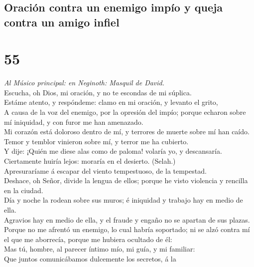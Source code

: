 \hypertarget{oraciuxf3n-contra-un-enemigo-impuxedo-y-queja-contra-un-amigo-infiel}{%
\subsection{Oración contra un enemigo impío y queja contra un amigo
infiel}\label{oraciuxf3n-contra-un-enemigo-impuxedo-y-queja-contra-un-amigo-infiel}}

\hypertarget{section-54}{%
\section{55}\label{section-54}}

 \emph{Al Músico principal: en Neginoth: Masquil de
David.}\\
Escucha, oh Dios, mi oración, y no te escondas de mi súplica.\\
 Estáme atento, y respóndeme: clamo en mi oración, y levanto
el grito,\\
 A causa de la voz del enemigo, por la opresión del impío;
porque echaron sobre mí iniquidad, y con furor me han amenazado.\\
 Mi corazón está doloroso dentro de mí, y terrores de muerte
sobre mí han caído.\\
 Temor y temblor vinieron sobre mí, y terror me ha
cubierto.\\
 Y dije: ¡Quién me diese alas como de paloma! volaría yo, y
descansaría.\\
 Ciertamente huiría lejos: moraría en el desierto.
(Selah.)\\
 Apresuraríame á escapar del viento tempestuoso, de la
tempestad.\\
 Deshace, oh Señor, divide la lengua de ellos; porque he
visto violencia y rencilla en la ciudad.\\
 Día y noche la rodean sobre sus muros; é iniquidad y
trabajo hay en medio de ella.\\
 Agravios hay en medio de ella, y el fraude y engaño no se
apartan de sus plazas.\\
 Porque no me afrentó un enemigo, lo cual habría soportado;
ni se alzó contra mí el que me aborrecía, porque me hubiera ocultado de
él:\\
 Mas tú, hombre, al parecer íntimo mío, mi guía, y mi
familiar:\\
 Que juntos comunicábamos dulcemente los secretos, á la
